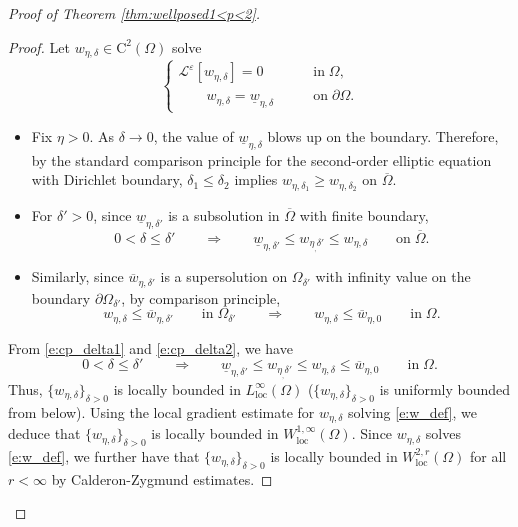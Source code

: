 \documentclass[12pt,reqno]{amsart}
\numberwithin{figure}{section}
\theoremstyle{plain}
\theoremstyle{remark}
\numberwithin{equation}{section}
\begin{document}
\begin{appendices}
\begin{proof} [Proof of Theorem \ref{thm:wellposed1<p<2}]
\begin{proof} Let $w_{\eta,\delta}\in \mathrm{C}^2(\Omega)$ solve
    \begin{equation}\label{e:w_def}
    \begin{cases}
        \mathcal{L}^\varepsilon\left[w_{\eta,\delta}\right] = 0 &\qquad\text{in}\;\Omega,\\
        \qquad w_{\eta,\delta} = \underline{w}_{\eta,\delta} &\qquad\text{on}\;\partial\Omega.
    \end{cases}
    \end{equation}
    \begin{itemize}
        \item Fix $\eta>0$. As $\delta\to 0$, the value of $\underline{w}_{\eta,\delta}$ blows up on the boundary. Therefore, by the standard comparison principle for the second-order elliptic equation with Dirichlet boundary, $\delta_1 \leq  \delta_2$ implies $w_{\eta,\delta_1}\geq  w_{\eta,\delta_2}$ on $\overline{\Omega}$. 
        \item For $\delta'>0$, since $\underline{w}_{\eta,\delta'}$ is a subsolution in $\overline{\Omega}$ with finite boundary, 
            \begin{equation}\label{e:cp_delta1}
                0<\delta \leq \delta'\qquad\Longrightarrow\qquad \underline{w}_{\eta,\delta'} \leq w_{\eta_,\delta'}\leq w_{\eta,\delta} \qquad\text{on}\;\overline{\Omega}.
            \end{equation}
        \item Similarly, since $\overline{w}_{\eta,\delta'}$ is a supersolution on $\Omega_{\delta'}$ with infinity value on the boundary $\partial\Omega_{\delta'}$, by comparison principle,
            \begin{equation}\label{e:cp_delta2}
                w_{\eta,\delta} \leq \overline{w}_{\eta, \delta'} \qquad\text{in}\;\Omega_{\delta'} \qquad\Longrightarrow\qquad w_{\eta,\delta} \leq \overline{w}_{\eta,0} \qquad\text{in}\;\Omega.
            \end{equation}
    \end{itemize}
    \noindent From \eqref{e:cp_delta1} and \eqref{e:cp_delta2}, we have
    \begin{equation}\label{e:cp_delta3}
        0<\delta \leq \delta'\qquad\Longrightarrow\qquad \underline{w}_{\eta,\delta'} \leq w_{\eta_,\delta'}\leq w_{\eta,\delta} \leq \overline{w}_{\eta,0} \qquad\text{in}\;\Omega.
    \end{equation}
    Thus, $\{w_{\eta,\delta}\}_{\delta>0}$ is locally bounded in $L^{\infty}_{\mathrm{loc}}(\Omega)$ ($\{w_{\eta,\delta}\}_{\delta>0}$ is uniformly bounded from below). Using the local gradient estimate for $w_{\eta,\delta}$ solving \eqref{e:w_def}, we deduce that $\{w_{\eta,\delta}\}_{\delta>0}$ is locally bounded in $W^{1,\infty}_{\mathrm{loc}}(\Omega)$. Since $w_{\eta,\delta}$ solves \eqref{e:w_def}, we further have that $\{w_{\eta,\delta}\}_{\delta>0}$ is locally bounded in $W^{2,r}_{\mathrm{loc}}(\Omega)$ for all $r<\infty$ by Calderon-Zygmund estimates.
    

\end{proof}
\end{proof}
\end{appendices}
\end{document}
